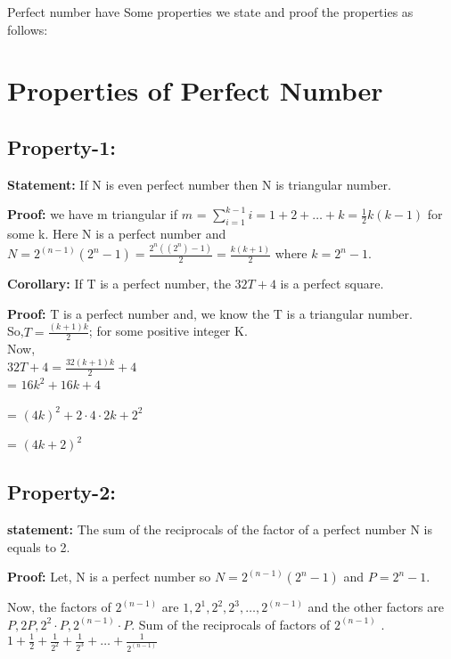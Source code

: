 \documentclass[12pt,,a4paper]{book}
\begin{document}
Perfect number have Some properties we state and proof the properties as follows: \\
\vspace{10pt}
\section{Properties of Perfect Number}
\subsection{Property-1:}
 \textbf{Statement:} If N is even perfect number then N is triangular number.
 
\textbf{Proof:}  we have m triangular if \(m\) = $\sum\limits_{i=1}^{k-1} i = 1 + 2 + \ldots + k = \frac{1}{2}k(k-1)$ for some k. Here N is a perfect number and\(N = 2^{(n-1)}(2^n-1) = \frac{{2^n((2^n)-1)}}{2} = \frac{k(k+1)}{2}\) where \(k = 2^n-1\).\\
\vspace{10pt}

\textbf{Corollary:}  If  T is a perfect  number, the  $32T + 4$ is a perfect square.
 

\textbf{Proof:} T is a perfect number and, we know the T  is a triangular number.\\

So,\(T = \frac{(k+1)k}{2}\); for some positive integer K.\\

Now,\\

\(32T+4 = \frac{32(k+1)k}{2} + 4\) \\

 = \(16k^2 + 16k + 4\)

 = \((4k)^2 + 2 \cdot 4 \cdot 2k + 2^2\)

= \((4k+2)^2\)
\vspace{10pt}\\

\subsection{Property-2:}
\textbf{statement:} The sum of the reciprocals of the factor of a perfect number N is equals to 2.

\textbf{Proof:} Let, N is a perfect number so \(N = 2^{(n-1)}(2^n-1)\) and \(P = 2^n-1\).

Now, the factors of \(2^{(n-1)}\) are \(1, 2^1, 2^2, 2^3, \ldots, 2^{(n-1)}\) and the other factors are \(P, 2P, 2^2 \cdot P, 2^{(n-1)} \cdot P\).  Sum of the reciprocals of factors of \(2^{(n-1)}\) . \\
$1 + \frac{1}{2} + \frac{1}{2^2} + \frac{1}{2^3} + \ldots + \frac{1}{2^{(n-1)}}$
\end{document}
